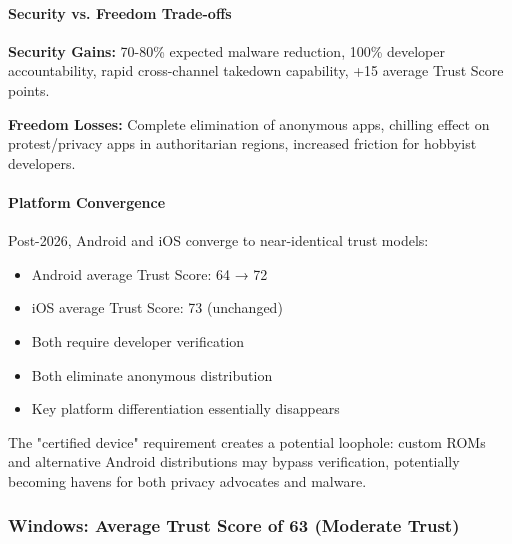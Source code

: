 \documentclass[11pt,a4paper]{article}
\begin{document}
\paragraph{Security vs. Freedom Trade-offs}
\textbf{Security Gains:} 70-80\% expected malware reduction, 100\% developer accountability, rapid cross-channel takedown capability, +15 average Trust Score points.

\textbf{Freedom Losses:} Complete elimination of anonymous apps, chilling effect on protest/privacy apps in authoritarian regions, increased friction for hobbyist developers.

\paragraph{Platform Convergence}
Post-2026, Android and iOS converge to near-identical trust models:
\begin{itemize}
    \item Android average Trust Score: 64 → 72
    \item iOS average Trust Score: 73 (unchanged)
    \item Both require developer verification
    \item Both eliminate anonymous distribution
    \item Key platform differentiation essentially disappears
\end{itemize}

The "certified device" requirement creates a potential loophole: custom ROMs and alternative Android distributions may bypass verification, potentially becoming havens for both privacy advocates and malware.

\subsubsection{Windows: Average Trust Score of 63 (Moderate Trust)}
\end{document}

